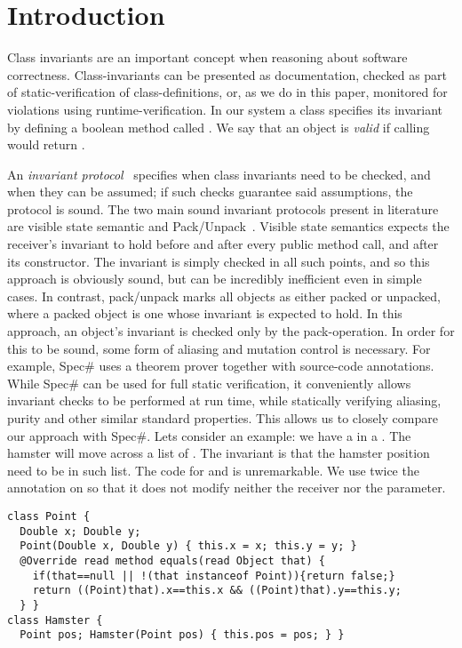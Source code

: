 \section{Introduction}

Class invariants are an important concept when reasoning about software correctness.
Class-invariants can be presented as documentation, checked as part of static-verification of class-definitions, or, as we do in this paper, monitored for violations using runtime-verification.
In our system a class specifies its invariant by defining a boolean method called \Q@invariant@. We say that an object is \emph{valid} if calling \Q@invariant@ would return \Q@true@.

An \emph{invariant protocol}~\cite{?} specifies when class invariants need to be checked, and when they can be assumed; if such checks guarantee said assumptions, the protocol is sound.
The two main sound invariant protocols present in literature are visible state semantic \cite{??} and Pack/Unpack~\cite{?}. Visible state semantics expects the receiver's invariant to hold before and after every public method call, and after its constructor. The invariant is simply checked in all such points, and so this approach is obviously sound, but can be incredibly inefficient even in simple cases.
In contrast, pack/unpack marks all objects as either packed or unpacked, where a packed object is one whose invariant is expected to hold.
In this approach, an object's invariant is checked only by the pack-operation.
In order for this to be sound, some form of aliasing and mutation control is necessary. For example, Spec\# uses a theorem prover together with source-code annotations.
While Spec\# can be used for full static verification, it conveniently allows invariant checks to be performed
at run time, while statically verifying aliasing, purity and other similar standard properties.
This allows us to closely compare our approach with Spec\#.
Lets consider an example: we have a \Q@Hamster@ in a \Q@Cage@.
The hamster will move across a list of \Q@Point@s.
The invariant is that the hamster position need to be in such list.
The code for \Q@Point@ and \Q@Hamster@ is unremarkable.
We use twice the annotation \Q@read@ on \Q@equals@ so that it does not modify neither the
receiver nor the parameter.
\begin{lstlisting}
class Point {
  Double x; Double y;
  Point(Double x, Double y) { this.x = x; this.y = y; }
  @Override read method equals(read Object that) {
	if(that==null || !(that instanceof Point)){return false;}
 	return ((Point)that).x==this.x && ((Point)that).y==this.y; 
  } }
class Hamster {
  Point pos; Hamster(Point pos) { this.pos = pos; } }
\end{lstlisting}
